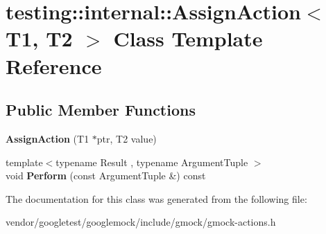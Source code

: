 \hypertarget{classtesting_1_1internal_1_1AssignAction}{}\section{testing\+:\+:internal\+:\+:Assign\+Action$<$ T1, T2 $>$ Class Template Reference}
\label{classtesting_1_1internal_1_1AssignAction}
\subsection*{Public Member Functions}
\begin{DoxyCompactItemize}
\item 
{\bfseries Assign\+Action} (T1 $\ast$ptr, T2 value)\hypertarget{classtesting_1_1internal_1_1AssignAction_ae5a8fe8954ff3f8b26a08b57c3afdf9a}{}\label{classtesting_1_1internal_1_1AssignAction_ae5a8fe8954ff3f8b26a08b57c3afdf9a}

\item 
{\footnotesize template$<$typename Result , typename Argument\+Tuple $>$ }\\void {\bfseries Perform} (const Argument\+Tuple \&) const \hypertarget{classtesting_1_1internal_1_1AssignAction_affbedc9143889ce5ce2cc099a8d69226}{}\label{classtesting_1_1internal_1_1AssignAction_affbedc9143889ce5ce2cc099a8d69226}

\end{DoxyCompactItemize}


The documentation for this class was generated from the following file\+:\begin{DoxyCompactItemize}
\item 
vendor/googletest/googlemock/include/gmock/gmock-\/actions.\+h\end{DoxyCompactItemize}
